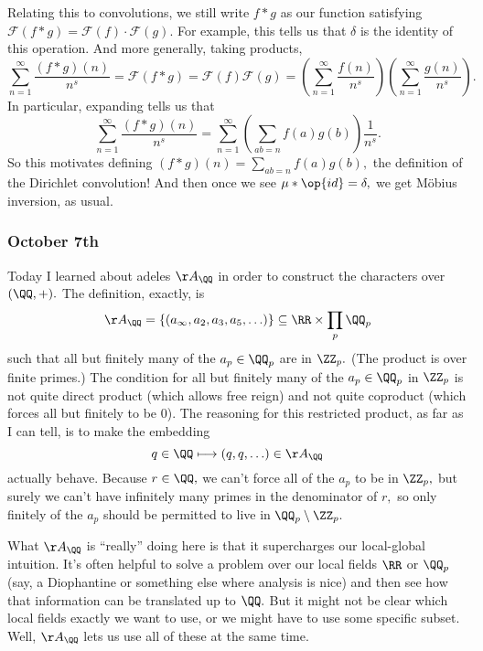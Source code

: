 Relating this to convolutions, we still write $f*g$ as our function satisfying $\mathcal F(f*g)=\mathcal F(f)\cdot\mathcal F(g).$ For example, this tells us that $\delta$ is the identity of this operation. And more generally, taking products,
\[\sum_{n=1}^\infty\frac{(f*g)(n)}{n^s}=\mathcal F(f*g)=\mathcal F(f)\mathcal F(g)=\left(\sum_{n=1}^\infty\frac{f(n)}{n^s}\right)\left(\sum_{n=1}^\infty\frac{g(n)}{n^s}\right).\]
In particular, expanding tells us that
\[\sum_{n=1}^\infty\frac{(f*g)(n)}{n^s}=\sum_{n=1}^\infty\left(\sum_{ab=n}f(a)g(b)\right)\frac1{n^s}.\]
So this motivates defining $(f*g)(n)=\sum_{ab=n}f(a)g(b),$ the definition of the Dirichlet convolution! And then once we see $\mu*\op{id}=\delta,$ we get M\"obius inversion, as usual.

\subsubsection{October 7th}
Today I learned about adeles $\AA_\QQ$ in order to construct the characters over $(\QQ,+).$ The definition, exactly, is
\[\AA_\QQ=\{(a_\infty,a_2,a_3,a_5,\ldots)\}\subseteq\RR\times\prod_p\QQ_p\]
such that all but finitely many of the $a_p\in\QQ_p$ are in $\ZZ_p.$ (The product is over finite primes.) The condition for all but finitely many of the $a_p\in\QQ_p$ in $\ZZ_p$ is not quite direct product (which allows free reign) and not quite coproduct (which forces all but finitely to be $0$). The reasoning for this restricted product, as far as I can tell, is to make the embedding
\[q\in\QQ\longmapsto(q,q,\ldots)\in\AA_\QQ\]
actually behave. Because $r\in\QQ,$ we can't force all of the $a_p$ to be in $\ZZ_p,$ but surely we can't have infinitely many primes in the denominator of $r,$ so only finitely of the $a_p$ should be permitted to live in $\QQ_p\setminus\ZZ_p.$

What $\AA_\QQ$ is ``really'' doing here is that it supercharges our local-global intuition. It's often helpful to solve a problem over our local fields $\RR$ or $\QQ_p$ (say, a Diophantine or something else where analysis is nice) and then see how that information can be translated up to $\QQ.$ But it might not be clear which local fields exactly we want to use, or we might have to use some specific subset. Well, $\AA_\QQ$ lets us use all of these at the same time.

